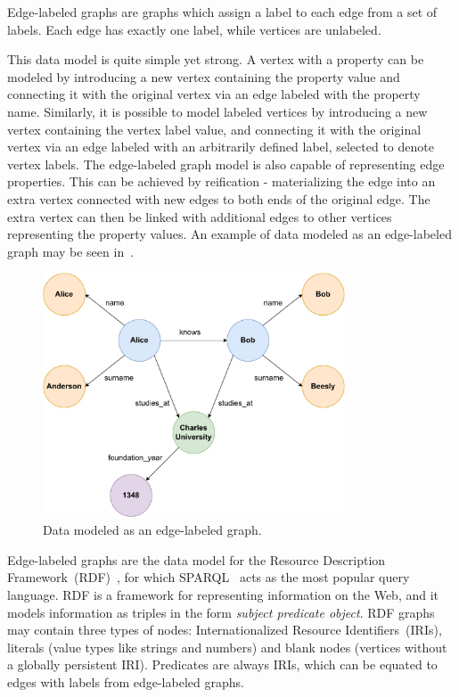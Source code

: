 Edge-labeled graphs are graphs which assign a label to each edge from a set of labels.
Each edge has exactly one label, while vertices are unlabeled.

This data model is quite simple yet strong.
A vertex with a property can be modeled by introducing a new vertex containing the property value and connecting it with the original vertex via an edge labeled with the property name.
Similarly, it is possible to model labeled vertices by introducing a new vertex containing the vertex label value, and connecting it with the original vertex via an edge labeled with an arbitrarily defined label, selected to denote vertex labels.
The edge-labeled graph model is also capable of representing edge properties.
This can be achieved by reification - materializing the edge into an extra vertex connected with new edges to both ends of the original edge.
The extra vertex can then be linked with additional edges to other vertices representing the property values.
An example of data modeled as an edge-labeled graph may be seen in~.

\begin{figure}[ht]
\centerline{\mbox{\includegraphics[width=0.8\textwidth]{img/edge-labeled-graph.pdf}}}
\caption{Data modeled as an edge-labeled graph.}
\label{fig:edgegraph}
\end{figure}

Edge-labeled graphs are the data model for the Resource Description Framework~(RDF)~\cite{rdf}, for which SPARQL~\cite{sparql} acts as the most popular query language.
RDF is a framework for representing information on the Web, and it models information as triples in the form \textit{subject predicate object}.
RDF graphs may contain three types of nodes: Internationalized Resource Identifiers~(IRIs), literals (value types like strings and numbers) and blank nodes (vertices without a globally persistent IRI).
Predicates are always IRIs, which can be equated to edges with labels from edge-labeled graphs.

